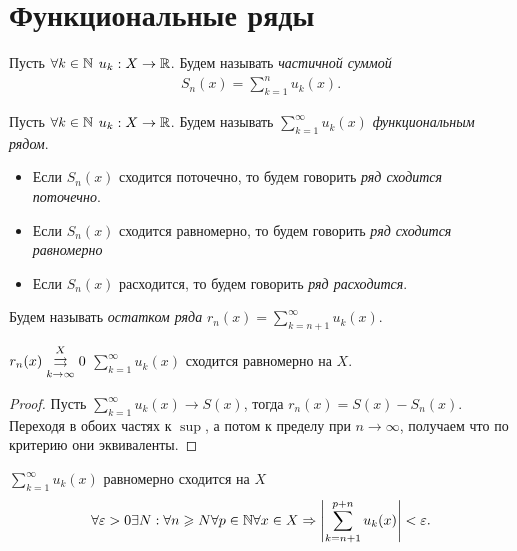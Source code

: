 \documentclass[../main.tex]{subfiles}
\begin{document}
 \section{Функциональные ряды}
 
 \begin{definition}
  Пусть $ \forall k \in \N$ $ u_k : X \to \R$. Будем называть \emph{частичной суммой} 
  \begin{gather} 
    S_n (x) = \sum_{k=1}^{n} u_k (x) .
  \end{gather}   
\end{definition}

 \begin{definition}
   Пусть $ \forall k \in \N$ $ u_k : X \to \R$. Будем называть $ \sum_{k=1}^{\infty} u_k(x)  $  \emph{функциональным рядом}.
  \begin{itemize}
    \item Если $ S_n(x)$ сходится поточечно, то будем говорить \emph{ряд сходится поточечно}. 
    \item Если $ S_{n}(x)$ сходится равномерно, то будем говорить \emph{ряд сходится равномерно}
    \item Если $ S_{n}(x)$ расходится, то будем говорить \emph{ряд расходится}.
  \end{itemize}
 \end{definition}

 
 \begin{definition}
   Будем называть \emph{остатком ряда} $ r_n (x) = \sum_{k=n+1}^{\infty} u_k(x) $. 
 \end{definition}
 
 \begin{proposition}
   $ r_n(x) \convergesuniformly{k \to \infty}{X} 0 $ \nas $ \sum_{k=1}^{\infty} u_k(x) $ сходится равномерно на $ X$.  
 \end{proposition}

\begin{proof}
  Пусть $ \sum_{k=1}^{\infty} u_k(x)  \to S(x)$, тогда $ r_n (x) = S(x) - S_n (x)$. Переходя в обоих частях к $ \sup$, а потом к пределу при $ n \to \infty$, получаем что по критерию они эквиваленты.
\end{proof}



\begin{proposition}
  $ \sum_{k=1}^{\infty} u_k(x)  $ равномерно сходится на $ X$  \nas 
  \begin{gather} 
    \forall \eps > 0 \exists N : \forall n \geq N \forall p \in \N \forall x \in X \hence \left| \sum_{k=n+1}^{p+n} u_k(x)   \right| < \eps.
  \end{gather}
\end{proposition}
\end{document}
